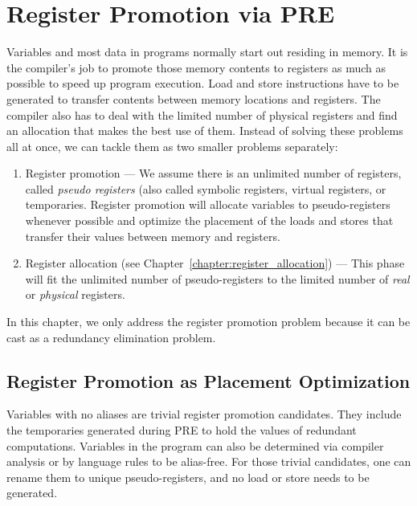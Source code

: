 \section{Register Promotion via PRE}
Variables and most data in programs normally start out residing in memory. 
It is the compiler's job to promote  those memory contents to registers as much as possible to speed up program execution.
Load and store instructions have to be generated to transfer contents between memory locations and registers. 
The compiler also has to deal with the limited number of physical registers and find an allocation that makes the best use of them. 
Instead of solving these problems all at once, we can tackle them as two smaller problems separately:
\begin{enumerate}
\item Register promotion --- We assume there is an unlimited number of registers, called \emph{pseudo registers} (also called symbolic registers, virtual registers, or temporaries. 
  Register promotion will allocate variables to pseudo-registers whenever possible and optimize the placement of the loads and stores that transfer their values between memory and registers.
\item Register allocation (see Chapter~\ref{chapter:register_allocation}) --- This phase will fit the unlimited number of pseudo-registers to the limited number of \emph{real} or \emph{physical} registers.
\end{enumerate}

In this chapter, we only address the register promotion problem because it can
be cast as a redundancy elimination problem.

\subsection{Register Promotion as Placement Optimization}
Variables with no aliases are trivial register promotion candidates. 
They include the temporaries generated during PRE to hold the values of redundant computations. 
Variables in the program can also be determined via compiler analysis or by language rules to be alias-free. 
For those trivial candidates, one can rename them to unique pseudo-registers, and no load or store needs to be generated.

